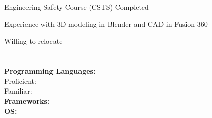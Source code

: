 \documentclass[a4paper]{modernsimplecv}
\begin{document}
\begin{paracol}{2}
\begin{minipage}[t]{\leftcolwidth}
        \section*{}
        {\raggedright
        \begin{tabitemize}
            \item Engineering Safety Course (CSTS) Completed 
            \item Experience with 3D modeling in Blender and CAD in Fusion 360
            \item Willing to relocate
        \end{tabitemize}
        }
        \vspace{1em}
    \end{minipage}

    \switchcolumn

    \begin{minipage}[t]{\rightcolwidth}
        \vspace{1em}
        \section*{}
        \begin{minipage}[t]{\textwidth}
            \raggedright
            {\normalsize\textbf{Programming Languages:}}\\
            Proficient:   
               \\
            Familiar:   
               
             \\
            {\normalsize\textbf{Frameworks: }}
               \\
            {\normalsize\textbf{OS: }}
              
        \end{minipage}

        \vspace{0pt}

\end{minipage}
\end{paracol}
\end{document}
